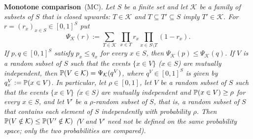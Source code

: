 \smallskip\noindent\textbf{Monotone comparison}~\textup{(MC)}.
\emph{Let $S$ be a finite set and let $\mathcal K$ be a family of subsets of $S$ that is closed upwards: $T\in\mathcal K$
and $T\subseteq T'\subseteq S$ imply $T'\in\mathcal K$. For $r=(r_x)_{x\in S}\in[0,1]^S$ put
\[
\Psi_{\mathcal K}(r):=\sum_{T\in\mathcal K}\ \prod_{x\in T}r_x\prod_{x\in S\setminus T}(1-r_x).
\]
If $p,q\in[0,1]^S$ satisfy $p_x\le q_x$ for every $x\in S$, then $\Psi_{\mathcal K}(p)\le\Psi_{\mathcal K}(q)$. If $V$
is a random subset of $S$ such that the events $\{x\in V\}$ \textup{(}$x\in S$\textup{)} are mutually independent, then
$\mathbb{P}(V\in\mathcal K)=\Psi_{\mathcal K}(q^V)$, where $q^V\in[0,1]^S$ is given by $q^V_x:=\mathbb{P}(x\in V)$. In
particular, let $\rho\in[0,1]$, let $V$ be a random subset of $S$ such that the events $\{x\in V\}$
\textup{(}$x\in S$\textup{)} are mutually independent and $\mathbb{P}(x\in V)\ge\rho$ for every $x\in S$, and let $V'$ be a
$\rho$-random subset of $S$, that is, a random subset of $S$ that contains each element of $S$ independently with
probability $\rho$. Then $\mathbb{P}(V\notin\mathcal K)\le\mathbb{P}(V'\notin\mathcal K)$ \textup{(}$V$ and $V'$ need not be
defined on the same probability space; only the two probabilities are compared\textup{)}.}

